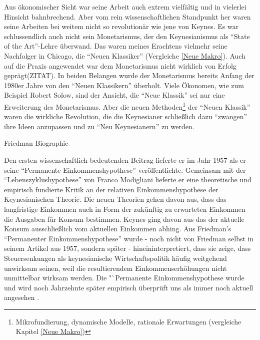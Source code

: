 Aus ökonomischer Sicht war seine Arbeit auch extrem vielfältig und in vielerlei Hinsicht bahnbrechend. Aber vom rein wissenschaftlichen Standpunkt her waren seine Arbeiten bei weitem nicht so revolutionär wie jene von Keynes. Es war schlussendlich auch nicht sein Monetarismus, der den Keynesianismus als "`State of the Art"'-Lehre überwand. Das waren meines Erachtens vielmehr seine Nachfolger in Chicago, die "`Neuen Klassiker"' (Vergleiche \ref{Neue Makro}). Auch auf die Praxis angewendet war dem Monetarismus nicht wirklich von Erfolg geprägt(ZITAT). In beiden Belangen wurde der Monetarismus bereits Anfang der 1980er Jahre von den "`Neuen Klassikern"' überholt. Viele Ökonomen, wie zum Beispiel Robert Solow, sind der Ansicht, die "`Neue Klassik"' sei nur eine Erweiterung des Monetarismus\parencite[S.342]{Warsh}. Aber die neuen Methoden\footnote{Mikrofundierung, dynamische Modelle, rationale Erwartungen (vergleiche Kapitel \ref{Neue Makro})} der "`Neuen Klassik"' waren die wirkliche Revolution, die die Keynesianer schließlich dazu "`zwangen"' ihre Ideen anzupassen und zu "`Neu Keynesianern"' zu werden.

Friedman Biographie


Den ersten wissenschaftlich bedeutenden Beitrag lieferte er im Jahr 1957 \parencite{Friedman1957} als er seine "`Permanente Einkommenshypothese"' veröffentlichte. Gemeinsam mit der "`Lebenszyklushypothese"' \parencite{Modigliani1954} von Franco Modigliani lieferte er eine theoretische und empirisch fundierte Kritik an der relativen Einkommenshypothese der Keynesianischen Theorie. Die neuen Theorien gehen davon aus, dass das langfristige Einkommen auch in Form der zukünftig zu erwarteten Einkommen die Ausgaben für Konsum bestimmen. Keynes ging davon aus das der aktuelle Konsum ausschließlich vom aktuellen Einkommen abhing. Aus Friedman's "`Permanenter Einkommenshypothese"' wurde - noch nicht von Friedman selbst in seinem Artikel aus 1957, sondern später - hineininterpretiert, dass sie zeige, dass Steuersenkungen als keynesianische Wirtschaftspolitik häufig weitgehend unwirksam seinen, weil die resultierendem Einkommenserhöhungen nicht unmittelbar wirksam werden. Die "`Permanente Einkommenshypothese wurde und wird noch Jahrzehnte später empirisch überprüft uns als immer noch aktuell angesehen \parencite{Bernanke1984, Mankiw1985}.  

